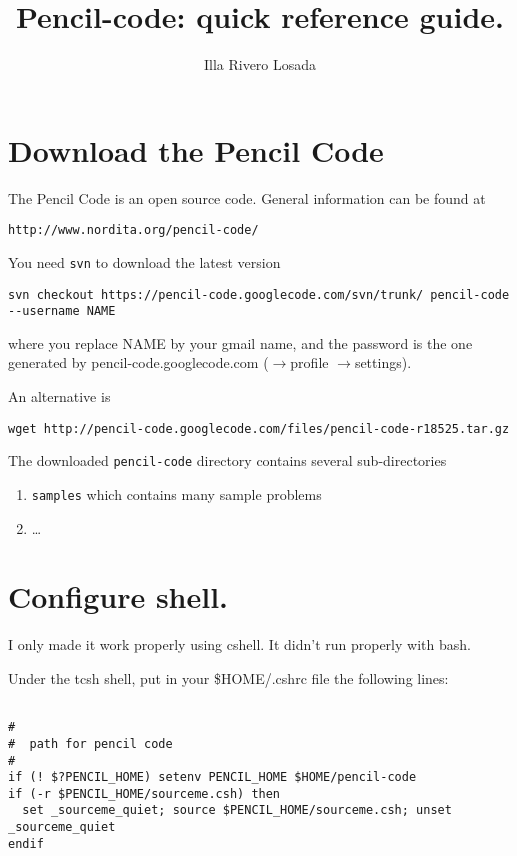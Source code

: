 \documentclass[a4paper,12pt]{article}
\title{Pencil-code: quick reference guide.}
\author{Illa Rivero Losada}
\date{}
\begin{document}
\maketitle

\tableofcontents

\newpage

\section{Download the Pencil Code}
The Pencil Code is an open source code. General information can be found at
\begin{verbatim}
http://www.nordita.org/pencil-code/
\end{verbatim}

You need \verb|svn| to download the latest version 
\begin{verbatim}
svn checkout https://pencil-code.googlecode.com/svn/trunk/ pencil-code
--username NAME
\end{verbatim}

where you replace NAME by your gmail name, and the password is the
one generated by pencil-code.googlecode.com ($\rightarrow$profile
$\rightarrow$settings). 

An alternative is
\begin{verbatim}
wget http://pencil-code.googlecode.com/files/pencil-code-r18525.tar.gz
\end{verbatim}

The downloaded \verb|pencil-code| directory contains several sub-directories
\begin{enumerate}
  \item \verb|samples| which contains many sample problems
  \item \dots
\end{enumerate}

\section{Configure shell.}

I only made it work properly using cshell. It didn't run properly with bash.

Under the tcsh shell, put in your \$HOME/.cshrc file the following lines:
\begin{verbatim}

#
#  path for pencil code
#
if (! $?PENCIL_HOME) setenv PENCIL_HOME $HOME/pencil-code
if (-r $PENCIL_HOME/sourceme.csh) then
  set _sourceme_quiet; source $PENCIL_HOME/sourceme.csh; unset _sourceme_quiet
endif
\end{verbatim}
\end{document}

